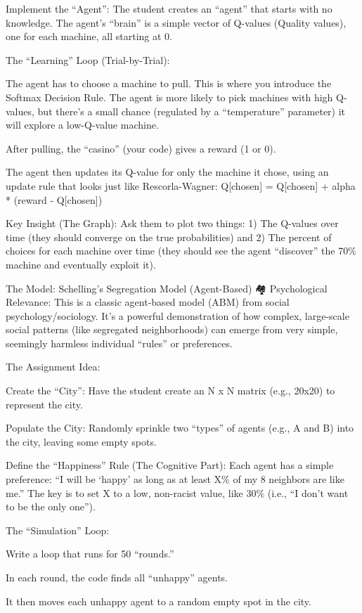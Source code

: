 \documentclass[
]{article}
\begin{document}
Implement the ``Agent'': The student creates an ``agent'' that starts
with no knowledge. The agent's ``brain'' is a simple vector of Q-values
(Quality values), one for each machine, all starting at 0.

The ``Learning'' Loop (Trial-by-Trial):

The agent has to choose a machine to pull. This is where you introduce
the Softmax Decision Rule. The agent is more likely to pick machines
with high Q-values, but there's a small chance (regulated by a
``temperature'' parameter) it will explore a low-Q-value machine.

After pulling, the ``casino'' (your code) gives a reward (1 or 0).

The agent then updates its Q-value for only the machine it chose, using
an update rule that looks just like Rescorla-Wagner: Q{[}chosen{]} =
Q{[}chosen{]} + alpha * (reward - Q{[}chosen{]})

Key Insight (The Graph): Ask them to plot two things: 1) The Q-values
over time (they should converge on the true probabilities) and 2) The
percent of choices for each machine over time (they should see the agent
``discover'' the 70\% machine and eventually exploit it).

The Model: Schelling's Segregation Model (Agent-Based) 🏘️ Psychological
Relevance: This is a classic agent-based model (ABM) from social
psychology/sociology. It's a powerful demonstration of how complex,
large-scale social patterns (like segregated neighborhoods) can emerge
from very simple, seemingly harmless individual ``rules'' or
preferences.

The Assignment Idea:

Create the ``City'': Have the student create an N x N matrix (e.g.,
20x20) to represent the city.

Populate the City: Randomly sprinkle two ``types'' of agents (e.g., A
and B) into the city, leaving some empty spots.

Define the ``Happiness'' Rule (The Cognitive Part): Each agent has a
simple preference: ``I will be `happy' as long as at least X\% of my 8
neighbors are like me.'' The key is to set X to a low, non-racist value,
like 30\% (i.e., ``I don't want to be the only one'').

The ``Simulation'' Loop:

Write a loop that runs for 50 ``rounds.''

In each round, the code finds all ``unhappy'' agents.

It then moves each unhappy agent to a random empty spot in the city.
\end{document}
